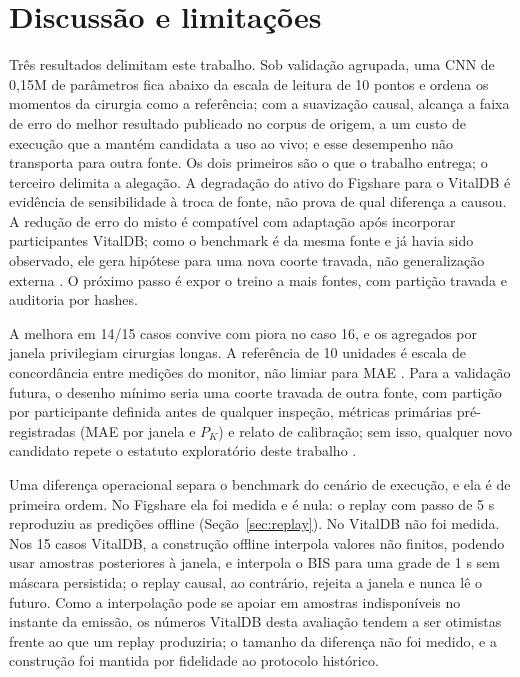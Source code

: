 \documentclass[12pt]{article}
\begin{document}
\section{Discussão e limitações}

Três resultados delimitam este trabalho. Sob validação agrupada, uma CNN de 0,15M de parâmetros fica abaixo da escala de leitura de 10 pontos e ordena os momentos da cirurgia como a referência; com a suavização causal, alcança a faixa de erro do melhor resultado publicado no corpus de origem, a um custo de execução que a mantém candidata a uso ao vivo; e esse desempenho não transporta para outra fonte. Os dois primeiros são o que o trabalho entrega; o terceiro delimita a alegação. A degradação do ativo do Figshare para o VitalDB é evidência de sensibilidade à troca de fonte, não prova de qual diferença a causou. A redução de erro do misto é compatível com adaptação após incorporar participantes VitalDB; como o benchmark é da mesma fonte e já havia sido observado, ele gera hipótese para uma nova coorte travada, não generalização externa \cite{lee2022,tripodai}. O próximo passo é expor o treino a mais fontes, com partição travada e auditoria por hashes.

A melhora em 14/15 casos convive com piora no caso 16, e os agregados por janela privilegiam cirurgias longas. A referência de 10 unidades é escala de concordância entre medições do monitor, não limiar para MAE \cite{harada2021}. Para a validação futura, o desenho mínimo seria uma coorte travada de outra fonte, com partição por participante definida antes de qualquer inspeção, métricas primárias pré-registradas (MAE por janela e $P_K$) e relato de calibração; sem isso, qualquer novo candidato repete o estatuto exploratório deste trabalho \cite{tripodai,archer2021}.

Uma diferença operacional separa o benchmark do cenário de execução, e ela é de primeira ordem. No Figshare ela foi medida e é nula: o replay com passo de 5 s reproduziu as predições offline (Seção~\ref{sec:replay}). No VitalDB não foi medida. Nos 15 casos VitalDB, a construção offline interpola valores não finitos, podendo usar amostras posteriores à janela, e interpola o BIS para uma grade de 1 s sem máscara persistida; o replay causal, ao contrário, rejeita a janela e nunca lê o futuro. Como a interpolação pode se apoiar em amostras indisponíveis no instante da emissão, os números VitalDB desta avaliação tendem a ser otimistas frente ao que um replay produziria; o tamanho da diferença não foi medido, e a construção foi mantida por fidelidade ao protocolo histórico.
\end{document}
